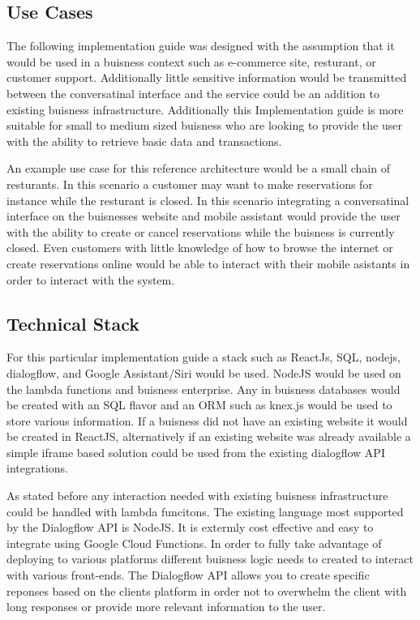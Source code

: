 \documentclass[9pt,software]{livecoms}
\begin{document}
\subsection{Use Cases}
The following implementation guide was designed with the assumption that it would be used in a buisness context such as 
e-commerce site, resturant, or customer support. Additionally little sensitive information would be transmitted between the 
conversatinal interface and the service could be an addition to existing buisness infrastructure. Additionally this 
Implementation guide is more suitable for small to medium sized buisness who are looking to provide the user with 
the ability to retrieve basic data and transactions.

An example use case for this reference architecture would be a small chain of resturants. In this scenario a customer may
want to make reservations for instance while the resturant is closed. In this scenario integrating a conversatinal interface 
on the buisnesses website and mobile assistant would provide the user with the ability to create or cancel reservations while 
the buisness is currently closed. Even customers with little knowledge of how to browse the internet or create reservations online
would be able to interact with their mobile asistants in order to interact with the system.  

\subsection{Technical Stack}
For this particular implementation guide a stack such as ReactJs, SQL, nodejs, dialogflow, and Google Assistant/Siri would be used. NodeJS would
be used on the lambda functions and buisness enterprise. Any in buisness databases would be created with an SQL flavor and an ORM such as 
knex.js would be used to store various information. If a buisness did not have an existing website it would be created in ReactJS, alternatively 
if an existing website was already available a simple iframe based solution could be used from the existing dialogflow API integrations.

As stated before any interaction needed with existing buisness infrastructure could be handled with lambda funcitons. The existing language most 
supported by the Dialogflow API is NodeJS. It is extermly cost effective and easy to integrate using Google Cloud Functions. In order to fully take
advantage of deploying to various platforms different buisness logic needs to created to interact with various front-ends. The Dialogflow API allows
you to create specific reponses based on the clients platform in order not to overwhelm the client with long responses or provide more relevant information
to the user.  
\end{document}
